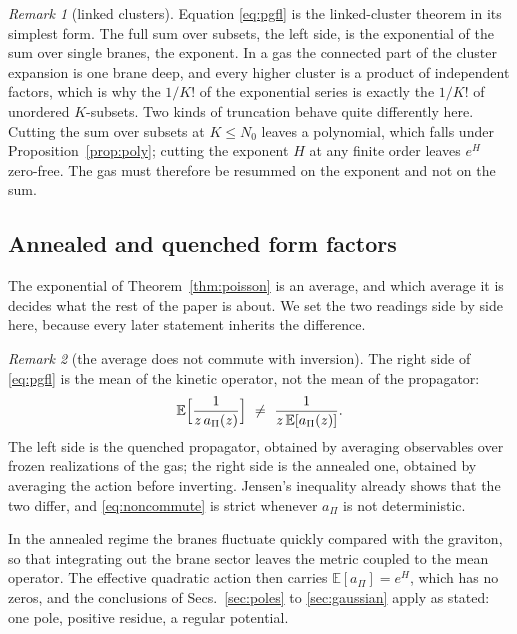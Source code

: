 \documentclass[aps,prd,10pt,twocolumn,superscriptaddress,nofootinbib,floatfix,longbibliography,showpacs,showkeys]{revtex4-2}
\theoremstyle{plain}
\theoremstyle{definition}
\theoremstyle{remark}
\newtheorem{remark}{Remark}
\newcommand{\bE}{\mathbb{E}}
\begin{document}
\begin{remark}[linked clusters]
Equation \eqref{eq:pgfl} is the linked-cluster theorem in its simplest form. The full sum over subsets, the left side, is the exponential of the sum over single branes, the exponent. In a gas the connected part of the cluster expansion is one brane deep, and every higher cluster is a product of independent factors, which is why the $1/K!$ of the exponential series is exactly the $1/K!$ of unordered $K$-subsets. Two kinds of truncation behave quite differently here. Cutting the sum over subsets at $K\le N_0$ leaves a polynomial, which falls under Proposition~\ref{prop:poly}; cutting the exponent $H$ at any finite order leaves $e^{H}$ zero-free. The gas must therefore be resummed on the exponent and not on the sum.
\end{remark}

\subsection{Annealed and quenched form factors}
\label{sec:annealed}

The exponential of Theorem~\ref{thm:poisson} is an average, and which average it is decides what the rest of the paper is about. We set the two readings side by side here, because every later statement inherits the difference.

\begin{remark}[the average does not commute with inversion]
\label{rem:annealed}
The right side of \eqref{eq:pgfl} is the mean of the kinetic operator, not the mean of the propagator:
\begin{equation}
\label{eq:noncommute}
\bE\Bigl[\frac{1}{z\,a_\Pi(z)}\Bigr]\ \neq\ \frac{1}{z\,\bE[a_\Pi(z)]} .
\end{equation}
The left side is the quenched propagator, obtained by averaging observables over frozen realizations of the gas; the right side is the annealed one, obtained by averaging the action before inverting. Jensen's inequality already shows that the two differ, and \eqref{eq:noncommute} is strict whenever $a_\Pi$ is not deterministic.
\end{remark}

In the annealed regime the branes fluctuate quickly compared with the graviton, so that integrating out the brane sector leaves the metric coupled to the mean operator. The effective quadratic action then carries $\bE[a_\Pi]=e^{H}$, which has no zeros, and the conclusions of Secs.~\ref{sec:poles} to \ref{sec:gaussian} apply as stated: one pole, positive residue, a regular potential.
\end{document}
